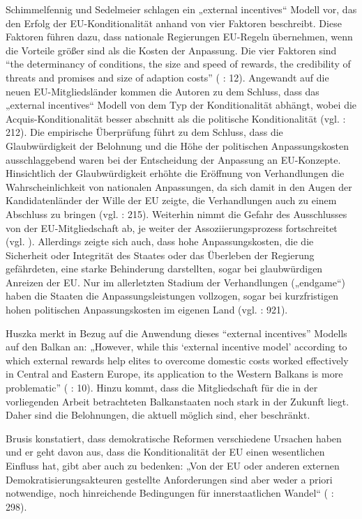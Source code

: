 \par
Schimmelfennig und Sedelmeier schlagen ein „external incentives“ Modell vor, das den Erfolg der EU-Konditionalität anhand von vier Faktoren beschreibt. Diese Faktoren führen dazu, dass nationale Regierungen EU-Regeln übernehmen, wenn die Vorteile größer sind als die Kosten der Anpassung. Die vier Faktoren sind “the determinancy of conditions, the size and speed of rewards, the credibility of threats and promises and size of adaption costs” (\cite{schsed05b} : 12). Angewandt auf die neuen EU-Mitgliedsländer kommen die Autoren zu dem Schluss, dass das „external incentives“ Modell von dem Typ der Konditionalität abhängt, wobei die Acquis-Konditionalität besser abschnitt als die politische Konditionalität (vgl. \cite{schsed05c} : 212). Die empirische Überprüfung führt zu dem Schluss, dass die Glaubwürdigkeit der Belohnung und die Höhe der politischen Anpassungskosten ausschlaggebend waren bei der Entscheidung der Anpassung an EU-Konzepte. Hinsichtlich der Glaubwürdigkeit erhöhte die Eröffnung von Verhandlungen die Wahrscheinlichkeit von nationalen Anpassungen, da sich damit in den Augen der Kandidatenländer der Wille der EU zeigte, die Verhandlungen auch zu einem Abschluss zu bringen (vgl. \cite{schsed05c} : 215). Weiterhin nimmt die Gefahr des Ausschlusses von der EU-Mitgliedschaft ab, je weiter der Assoziierungsprozess fortschreitet (vgl. \cite{dimit05}). Allerdings zeigte sich auch, dass hohe Anpassungskosten, die die Sicherheit oder Integrität des Staates oder das Überleben der Regierung gefährdeten, eine starke Behinderung darstellten, sogar bei glaubwürdigen Anreizen der EU. Nur im allerletzten Stadium der Verhandlungen („endgame“) haben die Staaten die Anpassungsleistungen vollzogen, sogar bei kurzfristigen hohen politischen Anpassungskosten im eigenen Land (vgl. \cite{schetal} : 921).\par

Huszka merkt in Bezug auf die Anwendung dieses “external incentives” Modells auf den Balkan an: „However, while this ‘external incentive model’ according to which external rewards help elites to overcome domestic costs worked effectively in Central and Eastern Europe, its application to the Western Balkans is more problematic” (\cite{huszka} : 10). Hinzu kommt, dass die Mitgliedschaft für die in der vorliegenden Arbeit betrachteten Balkanstaaten noch stark in der Zukunft liegt. Daher sind die Belohnungen, die aktuell möglich sind, eher beschränkt.\par

Brusis konstatiert, dass demokratische Reformen verschiedene Ursachen haben und er geht davon aus, dass die Konditionalität der EU einen wesentlichen Einfluss hat, gibt aber auch zu bedenken: „Von der EU oder anderen externen Demokratisierungsakteuren gestellte Anforderungen sind aber weder a priori notwendige, noch hinreichende Bedingungen für innerstaatlichen Wandel“ (\cite{brusis05} : 298).

